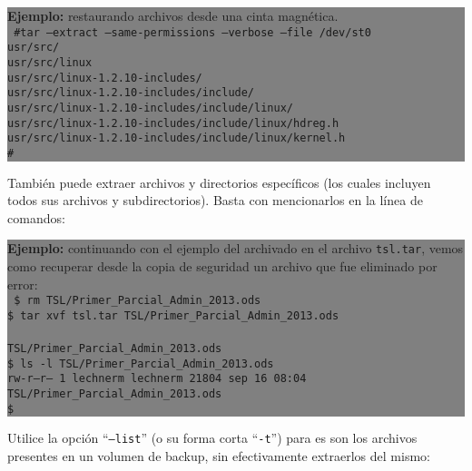 \documentclass[12pt]{article}
\begin{document}
\colorbox{grey}{\parbox[t]{0.95\linewidth}{ \vspace*{0.5cm} { 
{\bf Ejemplo:} restaurando archivos desde una cinta magnética. \\
{\tt
\#tar --extract --same-permissions --verbose --file /dev/st0\\
usr/src/\\
usr/src/linux\\
usr/src/linux-1.2.10-includes/\\
usr/src/linux-1.2.10-includes/include/\\
usr/src/linux-1.2.10-includes/include/linux/\\
usr/src/linux-1.2.10-includes/include/linux/hdreg.h\\
usr/src/linux-1.2.10-includes/include/linux/kernel.h\\
\#\\
}
} \vspace*{0.5cm} } } 

También puede extraer archivos y directorios específicos (los cuales 
incluyen todos sus archivos y subdirectorios). Basta con mencionarlos en 
la línea de comandos:

\colorbox{grey}{\parbox[t]{0.95\linewidth}{ \vspace*{0.5cm} { 
{\bf Ejemplo:} continuando con el ejemplo del archivado en el archivo 
{\tt tsl.tar}, vemos como recuperar desde la copia de seguridad un archivo
que fue eliminado por error: \\
{\tt
\$ rm TSL/Primer\_Parcial\_Admin\_2013.ods \\
\$ tar xvf tsl.tar TSL/Primer\_Parcial\_Admin\_2013.ods \\
\\TSL/Primer\_Parcial\_Admin\_2013.ods\\
\$ ls -l TSL/Primer\_Parcial\_Admin\_2013.ods\\
\-rw-r--r-- 1 lechnerm lechnerm 21804 sep 16 08:04 TSL/Primer\_Parcial\_Admin\_2013.ods\\
\$ \\
}
} \vspace*{0.5cm} } } 

Utilice la opción ``{\tt --list}'' (o su forma corta ``{\tt -t}'') para 
es son los archivos presentes en un volumen de backup, sin efectivamente 
extraerlos del mismo:
\end{document}
